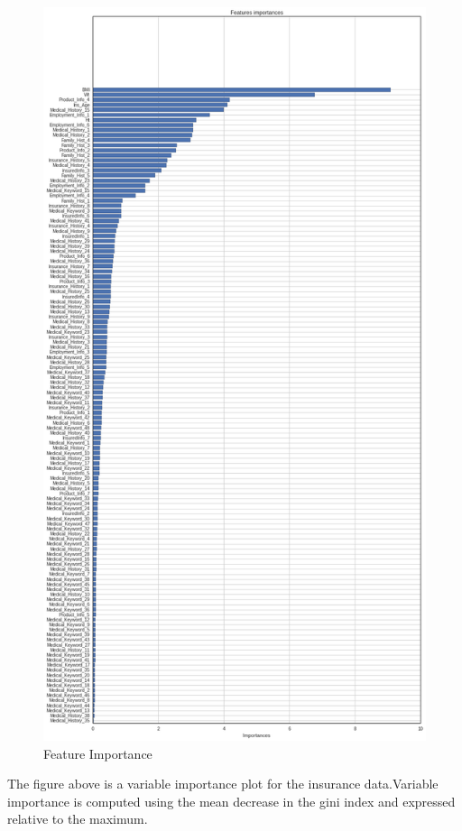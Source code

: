 \vspace{1pc}
\begin{figure}[hh!]
\caption{Feature Importance}
\includegraphics[scale=0.2]{index.png}
\end{figure}

The figure above is a variable importance plot for the insurance data.Variable importance is computed using the mean decrease in the gini index and expressed relative to the maximum.

